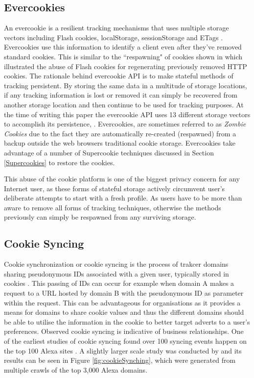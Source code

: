 \documentclass{article}
\begin{document}
\subsection{Evercookies}
An evercookie is a resilient tracking mechanisms that uses multiple storage vectors including Flash cookies, localStorage, sessionStorage and ETags \parencite{evercookies}. Evercookies use this information to identify a client even after they've removed standard cookies. This is similar to the ``respawning" of cookies shown in \parencite{flashCookiesPrivacy} which illustrated the abuse of Flash cookies for regenerating previously removed HTTP cookies. The rationale behind evercookie API is to make stateful methods of tracking persistent. By storing the same data in a multitude of storage locations, if any tracking information is lost or removed it can simply be recovered from another storage location and then continue to be used for tracking purposes. At the time of writing this paper the evercookie API uses 13 different storage vectors to accomplish its persistence,  \parencite{evercookies}. Evercookies, are sometimes referred to as \textit{Zombie Cookies} due to the fact they are automatically re-created (respawned) from a backup outside the web browsers traditional cookie storage. Evercookies take advantage of a number of Supercookie techniques discussed in Section \ref{Supercookies} to restore the cookies. \newline

This abuse of the cookie platform is one of the biggest privacy concern for any Internet user, as these forms of stateful storage actively circumvent user's deliberate attempts to start with a fresh profile. As users have to be more than aware to remove all forms of tracking techniques, otherwise the methods previously can simply be respawned from any surviving storage. 

\subsection{Cookie Syncing}
Cookie synchronization or cookie syncing is the process of trakcer domains sharing pseudonymous IDs associated with a given user, typically stored in cookies \parencite{webNeverForgets}. This passing of IDs can occur for example when domain A makes a request to a URL hosted by domain B with the pseudonymous ID as parameter within the request. This can be advantageous for organisations as it provides a means for domains to share cookie values and thus the different domains should be able to utilise the information in the cookie to better target adverts to a user's preferences. Observed cookie syncing is indicative of business relationships.  One of the earliest studies of cookie syncing found over 100 syncing events happen on the top 100 Alexa sites \parencite{sellingPrivacy}. A slightly larger scale study was conducted by \parencite{webNeverForgets} and its results can be seen in Figure \ref{fig:cookieSynching}, which were generated from multiple crawls of the top 3,000 Alexa domains. 
\end{document}
